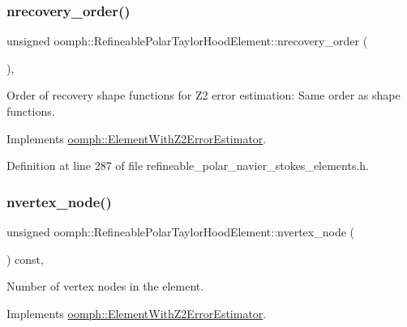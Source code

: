 \subsubsection{\texorpdfstring{nrecovery\+\_\+order()}{nrecovery\_order()}}
{\footnotesize\ttfamily unsigned oomph\+::\+Refineable\+Polar\+Taylor\+Hood\+Element\+::nrecovery\+\_\+order (\begin{DoxyParamCaption}{ }\end{DoxyParamCaption})\hspace{0.3cm}{\ttfamily [inline]}, {\ttfamily [virtual]}}



Order of recovery shape functions for Z2 error estimation\+: Same order as shape functions. 



Implements \hyperlink{classoomph_1_1ElementWithZ2ErrorEstimator_af39480835bd3e0f6b2f4f7a9a4044798}{oomph\+::\+Element\+With\+Z2\+Error\+Estimator}.



Definition at line 287 of file refineable\+\_\+polar\+\_\+navier\+\_\+stokes\+\_\+elements.\+h.

\mbox{\label{classoomph_1_1RefineablePolarTaylorHoodElement_a227872425bda8de11fd94b625eeffbd0}} 
\subsubsection{\texorpdfstring{nvertex\+\_\+node()}{nvertex\_node()}}
{\footnotesize\ttfamily unsigned oomph\+::\+Refineable\+Polar\+Taylor\+Hood\+Element\+::nvertex\+\_\+node (\begin{DoxyParamCaption}{ }\end{DoxyParamCaption}) const\hspace{0.3cm}{\ttfamily [inline]}, {\ttfamily [virtual]}}



Number of vertex nodes in the element. 



Implements \hyperlink{classoomph_1_1ElementWithZ2ErrorEstimator_a19495a0e77ef4ff35f15fdf7913b4077}{oomph\+::\+Element\+With\+Z2\+Error\+Estimator}.



